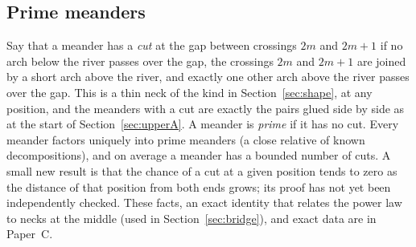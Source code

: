 \subsection{Prime meanders}

Say that a meander has a \emph{cut} at the gap between crossings $2m$ and $2m+1$ if no arch
below the river passes over the gap, the crossings $2m$ and $2m+1$ are joined by a short arch
above the river, and exactly one other arch above the river passes over the gap. This is a thin
neck of the kind in Section~\ref{sec:shape}, at any position, and the meanders with a cut are
exactly the pairs glued side by side as at the start of Section~\ref{sec:upperA}. A meander is
\emph{prime} if it has no cut. Every meander factors uniquely into prime meanders (a close
relative of known decompositions), and on average a meander has a bounded number of cuts. A small new result is that the chance of a cut at a given
position tends to zero as the distance of that position from both ends grows; its proof has not
yet been independently checked. These facts, an exact identity that relates the power law to
necks at the middle (used in Section~\ref{sec:bridge}), and exact data are in Paper~C.
